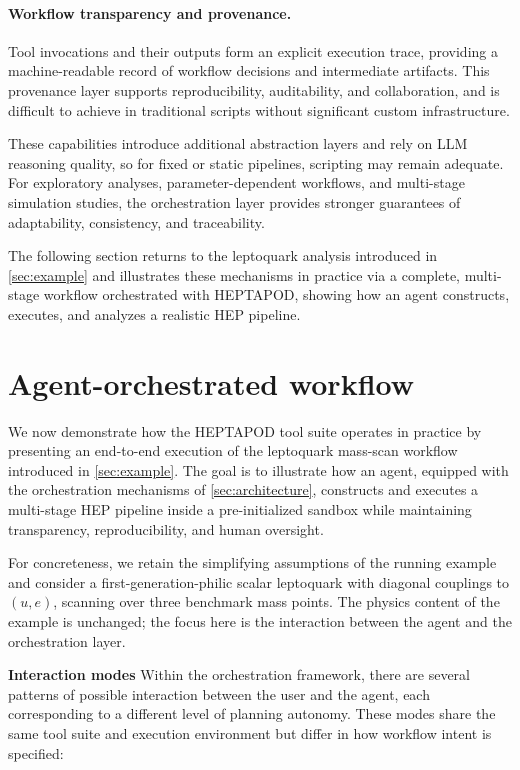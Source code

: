 \documentclass[11pt,oneside]{article}
\numberwithin{equation}{section}
\newcommand{\pkgname}{HEPTAPOD\xspace}
\begin{document}
\paragraph{Workflow transparency and provenance.}
Tool invocations and their outputs form an explicit execution trace, providing a machine-readable record of workflow decisions and intermediate artifacts. This provenance layer supports reproducibility, auditability, and collaboration, and is difficult to achieve in traditional scripts without significant custom infrastructure.

These capabilities introduce additional abstraction layers and rely on LLM reasoning quality, so for fixed or static pipelines, scripting may remain adequate. For exploratory analyses, parameter-dependent workflows, and multi-stage simulation studies, the orchestration layer provides stronger guarantees of adaptability, consistency, and traceability.

The following section returns to the leptoquark analysis introduced in \cref{sec:example} and illustrates these mechanisms in practice via a complete, multi-stage workflow orchestrated with \pkgname, showing how an agent constructs, executes, and analyzes a realistic HEP pipeline.

\section{Agent-orchestrated workflow}
\label{sec:example_full}

We now demonstrate how the \pkgname tool suite operates in practice by presenting an end-to-end execution of the leptoquark mass-scan workflow introduced in \cref{sec:example}. 
The goal is to illustrate how an agent, equipped with the orchestration mechanisms of \cref{sec:architecture}, constructs and executes a multi-stage HEP pipeline inside a pre-initialized sandbox while maintaining transparency, reproducibility, and human oversight. 

For concreteness, we retain the simplifying assumptions of the running example and consider a first-generation-philic scalar leptoquark with diagonal couplings to $(u,e)$, scanning over three benchmark mass points. 
The physics content of the example is unchanged; the focus here is the interaction between the agent and the orchestration layer.

\vspace{0.5em}
\noindent\textbf{Interaction modes}
Within the orchestration framework, there are several patterns of possible interaction between the user and the agent, each corresponding to a different level of planning autonomy. These modes share the same tool suite and execution environment but differ in how workflow intent is specified:
\end{document}
